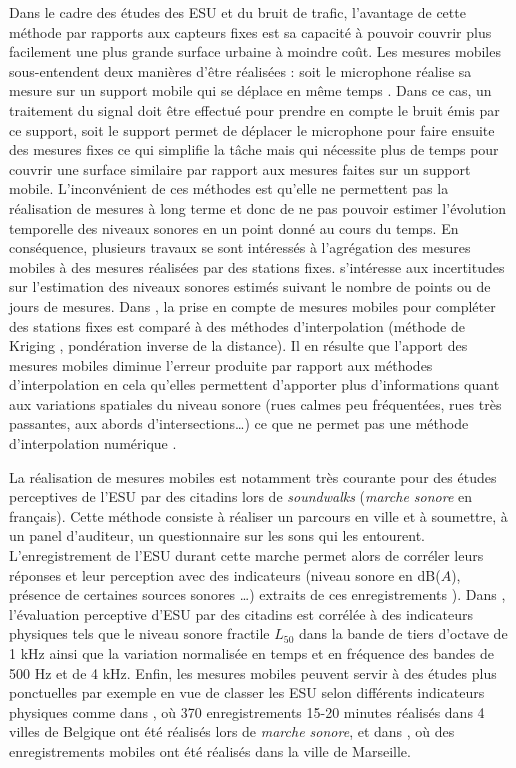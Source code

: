 Dans le cadre des études des ESU et du bruit de trafic, l'avantage de cette méthode par rapports aux capteurs fixes est sa capacité à pouvoir couvrir plus facilement une plus grande surface urbaine à moindre coût. Les mesures mobiles sous-entendent deux manières d'être réalisées : soit le microphone réalise sa mesure sur un support mobile qui se déplace en même temps \cite{alsina-pages_design_2016}. Dans ce cas, un traitement du signal doit être effectué pour prendre en compte le bruit émis par ce support, soit le support permet de déplacer le microphone pour faire ensuite des mesures fixes \cite{manvell2004sadmam} ce qui simplifie la tâche mais qui nécessite plus de temps pour couvrir une surface similaire par rapport aux mesures faites sur un support mobile.
L'inconvénient de ces méthodes est qu'elle ne permettent pas la réalisation de mesures à long terme et donc de ne pas pouvoir estimer l'évolution temporelle des niveaux sonores en un point donné au cours du temps.
En conséquence, plusieurs travaux se sont intéressés à l'agrégation des mesures mobiles à des mesures réalisées par des stations fixes.
\cite{morillas2014uncertainty} s'intéresse aux incertitudes sur l'estimation des niveaux sonores estimés suivant le nombre de points ou de jours de mesures. Dans \cite{can_measurement_2014}, la prise en compte de mesures mobiles pour compléter des stations fixes est comparé à des méthodes d'interpolation (méthode de Kriging , pondération inverse de la distance). Il en résulte que l'apport des mesures mobiles diminue l'erreur produite par rapport aux méthodes d'interpolation en cela qu'elles permettent d'apporter plus d'informations quant aux variations spatiales du niveau sonore (rues calmes peu fréquentées, rues très passantes, aux abords d'intersections\dots) ce que ne permet pas une méthode d'interpolation numérique \cite{aumond2018kriging}.

La réalisation de mesures mobiles est notamment très courante pour des études perceptives de l'ESU par des citadins lors de \textit{soundwalks} (\textit{marche sonore} en français). Cette méthode consiste à réaliser un parcours en ville et à soumettre, à un panel d'auditeur, un questionnaire sur les sons qui les entourent. L'enregistrement de l'ESU durant cette marche permet alors de corréler leurs réponses et leur perception avec des indicateurs (niveau sonore en dB($A$), présence de certaines sources sonores \dots{}) extraits de ces enregistrements \cite{brocolini_measurements_2013, hong2013designing}). Dans \cite{aumond2017modeling}, l'évaluation perceptive d'ESU par des citadins est corrélée à des indicateurs physiques tels que le niveau sonore fractile $L_{50}$ dans la bande de tiers d'octave de 1 kHz ainsi que la variation normalisée en temps et en fréquence des bandes de 500 Hz et de 4 kHz.
Enfin, les mesures mobiles peuvent servir à des études plus ponctuelles par exemple en vue de classer les ESU selon différents indicateurs physiques comme dans \cite{rychtarikova2013soundscape}, où 370 enregistrements 15-20 minutes réalisés dans 4 villes de Belgique ont été réalisés lors de \textit{marche sonore}, et dans \cite{can_describing_2015}, où des enregistrements mobiles ont été réalisés dans la ville de Marseille.

